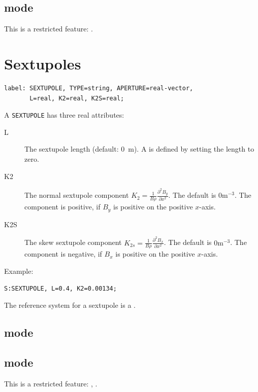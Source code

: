 \subsection{\opalcycl mode}

This is a restricted feature:  \noopalcycl .

\section{Sextupoles}
\label{sec:sextupole}
\begin{verbatim}
label: SEXTUPOLE, TYPE=string, APERTURE=real-vector,
       L=real, K2=real, K2S=real;
\end{verbatim}
A \texttt{SEXTUPOLE} has three real attributes:
\begin{description}
\item[L]
  The sextupole length (default: 0~m).
  A  is defined by setting the length to zero.
\item[K2]
  The normal sextupole component
  $K_2=\frac{1}{B \rho}\frac{\partial^2 B_y}{\partial x^2}$.
  The default is $0 \mathrm{m}^{-3}$.
  The component is positive, if $B_y$ is positive on the positive $x$-axis.
\item[K2S]
  The skew sextupole component
  $K_{2s}=\frac{1}{B \rho}\frac{\partial^2 B_x}{\partial x^2}$.
  The default is $0 \mathrm{m}^{-3}$.
  The component is negative, if $B_x$ is positive on the positive $x$-axis.
\end{description}
\noindent Example:
\begin{verbatim}
S:SEXTUPOLE, L=0.4, K2=0.00134;
\end{verbatim}
The reference system for a sextupole is a 
.
\subsection{\opalt mode}

\subsection{\opalcycl mode}

This is a restricted feature: \noopalt, \noopalcycl .

